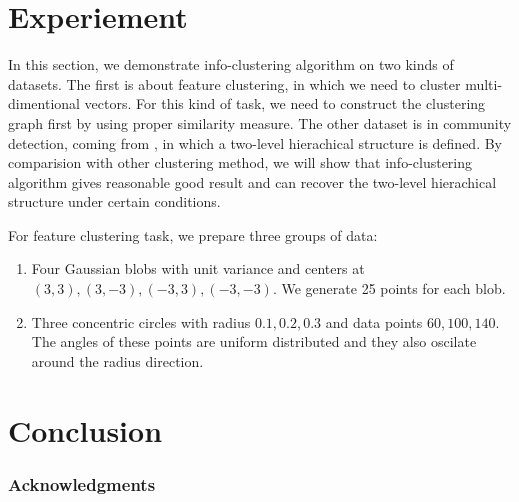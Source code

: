 \documentclass{article}
\begin{document}
\section{Experiement}\label{sec:experiment}
In this section, we demonstrate info-clustering algorithm on two kinds of datasets. The first is about feature clustering, in which we need to cluster multi-dimentional vectors. For this kind of task, we need to construct the clustering graph first by using proper similarity measure. The other dataset is in community detection, coming from \cite{RN22}, in which a two-level hierachical structure is defined. By comparision with other clustering method, we will show that info-clustering algorithm gives reasonable good result and can recover the two-level hierachical structure under certain conditions. 

For feature clustering task, we prepare three groups of data:
\begin{enumerate}
\item Four Gaussian blobs with unit variance and centers at $(3,3), (3,-3), (-3,3), (-3,-3)$.  We generate 25 points for each blob.
\item Three concentric circles with radius $0.1,0.2,0.3$ and data points $60, 100, 140$. The angles of these points are uniform distributed and they also oscilate around the radius direction.
\end{enumerate}
\section{Conclusion}\label{sec:conclusion}



\subsubsection*{Acknowledgments}





\end{document}

